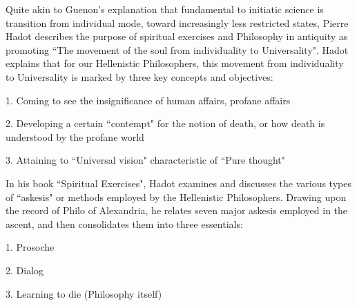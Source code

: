 Quite akin to Guenon's explanation that fundamental to initiatic science is transition from individual mode, toward increasingly less restricted states, Pierre Hadot describes the purpose of spiritual exercises and Philosophy in antiquity as promoting ``The movement of the soul from individuality to Universality". Hadot explains that for our Hellenistic Philosophers, this movement from individuality to Universality is marked by three key concepts and objectives:

1. Coming to see the insignificance of human affairs, profane affairs

2. Developing a certain ``contempt" for the notion of death, or how death is understood by the profane world

3. Attaining to ``Universal vision" characteristic of ``Pure thought"

In his book ``Spiritual Exercises", Hadot examines and discusses the various types of ``askesis" or methods employed by the Hellenistic Philosophers. Drawing upon the record of Philo of Alexandria, he relates seven major askesis employed in the ascent, and then consolidates them into three essentials:

1. Prosoche

2. Dialog

3. Learning to die (Philosophy itself)

